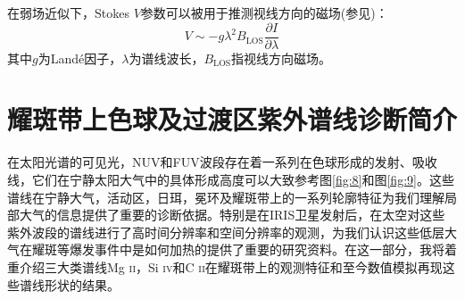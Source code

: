 在弱场近似下，Stokes $V$参数可以被用于推测视线方向的磁场(参见\cites{Stenflo1994})：
\begin{equation}
	V \sim-g \lambda^{2} B_{\mathrm{LOS}} \frac{\partial I}{\partial \lambda}
\end{equation}
其中$g$为Landé因子，$\lambda$为谱线波长，$B_{\mathrm{LOS}}$指视线方向磁场。
\section{耀斑带上色球及过渡区紫外谱线诊断简介}\label{sec:1.3}
在太阳光谱的可见光，NUV和FUV波段存在着一系列在色球形成的发射、吸收线，它们在宁静太阳大气中的具体形成高度可以大致参考图\ref{fig:8}和图\ref{fig:9}。这些谱线在宁静大气，活动区，日珥，冕环及耀斑带上的一系列轮廓特征为我们理解局部大气的信息提供了重要的诊断依据。特别是在IRIS卫星发射后，在太空对这些紫外波段的谱线进行了高时间分辨率和空间分辨率的观测，为我们认识这些低层大气在耀斑等爆发事件中是如何加热的提供了重要的研究资料。在这一部分，我将着重介绍三大类谱线Mg \textsc{ii}，Si \textsc{iv}和C \textsc{ii}在耀斑带上的观测特征和至今数值模拟再现这些谱线形状的结果。

